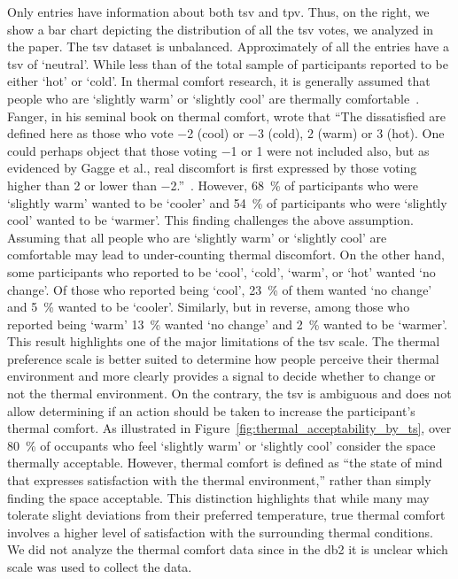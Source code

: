 Only  entries have information about both \ac{tsv} and \ac{tpv}.
Thus, on the right, we show a bar chart depicting the distribution of all the \ac{tsv} votes, we analyzed in the paper.
The \ac{tsv} dataset is unbalanced.
Approximately  of all the entries have a \ac{tsv} of `neutral'.
While less than  of the total sample of participants reported to be either `hot' or `cold'.
In thermal comfort research, it is generally assumed that people who are `slightly warm' or `slightly cool' are thermally comfortable~\cite{Fanger1970, schweiker2020evaluating}.
Fanger, in his seminal book on thermal comfort, wrote that ``The dissatisfied are defined here as those who vote \num{-2} (cool) or \num{-3} (cold), \num{2} (warm) or \num{3} (hot).
One could perhaps object that those voting \num{-1} or \num{1} were not included also, but as evidenced by Gagge et al., real discomfort is first expressed by those voting higher than \num{2} or lower than \num{-2}.''~\cite{Fanger1970}.
However, \qty{68}{\percent} of participants who were `slightly warm' wanted to be `cooler' and \qty{54}{\percent} of participants who were `slightly cool' wanted to be `warmer'.
This finding challenges the above assumption.
Assuming that all people who are `slightly warm' or `slightly cool' are comfortable may lead to under-counting thermal discomfort.
On the other hand, some participants who reported to be `cool', `cold', `warm', or `hot' wanted `no change'.
Of those who reported being `cool', \qty{23}{\percent} of them wanted `no change' and \qty{5}{\percent} wanted to be `cooler'.
Similarly, but in reverse, among those who reported being `warm' \qty{13}{\percent} wanted `no change' and \qty{2}{\percent} wanted to be `warmer'.
This result highlights one of the major limitations of the \ac{tsv} scale.
The thermal preference scale is better suited to determine how people perceive their thermal environment and more clearly provides a signal to decide whether to change or not the thermal environment.
On the contrary, the \ac{tsv} is ambiguous and does not allow determining if an action should be taken to increase the participant's thermal comfort.
As illustrated in Figure~\ref{fig:thermal_acceptability_by_ts}, over \qty{80}{\percent} of occupants who feel `slightly warm' or `slightly cool' consider the space thermally acceptable.
However, thermal comfort is defined as ``the state of mind that expresses satisfaction with the thermal environment,'' rather than simply finding the space acceptable. 
This distinction highlights that while many may tolerate slight deviations from their preferred temperature, true thermal comfort involves a higher level of satisfaction with the surrounding thermal conditions.
We did not analyze the thermal comfort data since in the \ac{db2} it is unclear which scale was used to collect the data.

